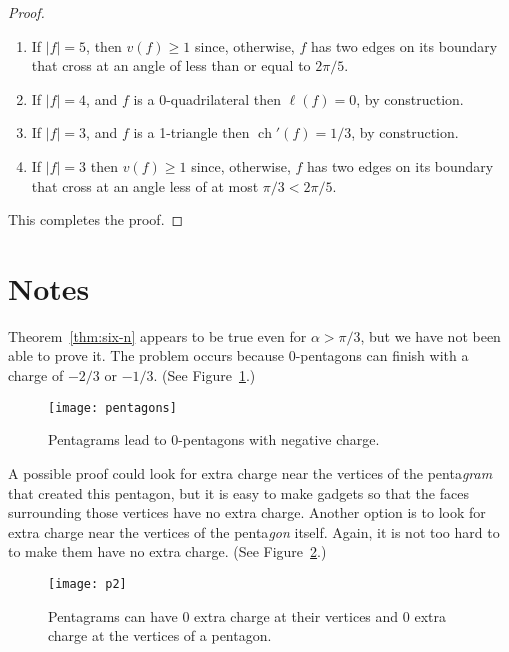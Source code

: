 \documentclass{patmorin}
\DeclareMathOperator{\ch}{ch}
\newcommand{\figlabel}[1]{\label{fig:#1}}
\newcommand{\figref}[1]{\mbox{Figure~\ref{fig:#1}}}
\begin{document}
\begin{proof}
\begin{enumerate}
\item If $|f|=5$, then $v(f) \ge 1$ since, otherwise, $f$ has two edges on
its boundary that cross at an angle of less than or equal to $2\pi/5$.

\item If $|f|=4$, and $f$ is a 0-quadrilateral then $\ell(f)=0$, by construction.

\item If $|f|=3$, and $f$ is a 1-triangle then $\ch'(f)=1/3$, by construction.

\item If $|f|=3$ then $v(f)\ge 1$ since, otherwise, $f$ has two edges on
its boundary that cross at an angle less of at most $\pi/3 < 2\pi/5$.
\end{enumerate}
This completes the proof.
\end{proof}


\section{Notes}

Theorem~\ref{thm:six-n} appears to be true even for $\alpha > \pi/3$, but we have not
been able to prove it. The problem occurs because 0-pentagons can finish with
a charge of $-2/3$ or $-1/3$. (See \figref{pentagons}.)

\begin{figure}
  \begin{center}
    \texttt{[image: pentagons]}
  \end{center}
  \caption{Pentagrams lead to 0-pentagons with negative charge.}
  \figlabel{pentagons}
\end{figure}

A possible proof could look for extra charge near the vertices of the
penta\emph{gram} that created this pentagon, but it is easy to make gadgets
so that the faces surrounding those vertices have no extra charge.  Another
option is to look for extra charge near the vertices of the penta\emph{gon}
itself. Again, it is not too hard to to make them have no extra charge.
(See \figref{p2}.)

\begin{figure} [bth]
  \begin{center}
    \texttt{[image: p2]}
  \end{center}
  \caption{Pentagrams can have 0 extra charge at their vertices and
           0 extra charge at the vertices of a pentagon.}
  \figlabel{p2}
\end{figure}
\end{document}
